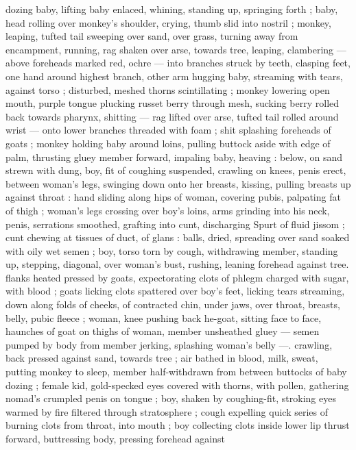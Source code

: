 dozing baby, lifting baby enlaced, whining, standing up, springing 
forth ; baby, head rolling over monkey's shoulder, crying, thumb slid 
into nostril ; monkey, leaping, tufted tail sweeping over sand, over 
grass, turning away from encampment, running, rag shaken over 
arse, towards tree, leaping, clambering --- above foreheads marked 
red, ochre --- into branches struck by teeth, clasping feet, one hand 
around highest branch, other arm hugging baby, streaming with 
tears, against torso ; disturbed, meshed thorns scintillating ; monkey 
lowering open mouth, purple tongue plucking russet berry through 
mesh, sucking berry rolled back towards pharynx, shitting --- rag 
lifted over arse, tufted tail rolled around wrist --- onto lower 
branches threaded with foam ; shit splashing foreheads of goats ; 
monkey holding baby around loins, pulling buttock aside with edge 
of palm, thrusting gluey member forward, impaling baby, heaving : 
below, on sand strewn with dung, boy, fit of coughing suspended, 
crawling on knees, penis erect, between woman's legs, swinging 
down onto her breasts, kissing, pulling breasts up against throat : 
hand sliding along hips of woman, covering pubis, palpating fat of 
thigh ; woman's legs crossing over boy's loins, arms grinding into his 
neck, penis, serrations smoothed, grafting into cunt, discharging 
Spurt of fluid jissom ; cunt chewing at tissues of duct, of glans : 
balls, dried, spreading over sand soaked with oily wet semen ; boy, 
torso torn by cough, withdrawing member, standing up, stepping, 
diagonal, over woman's bust, rushing, leaning forehead against tree. 
flanks heated pressed by goats, expectorating clots of phlegm 
charged with sugar, with blood ; goats licking clots spattered over 
boy's feet, licking tears streaming, down along folds of cheeks, of 
contracted chin, under jaws, over throat, breasts, belly, pubic fleece 
; woman, knee pushing back he-goat, sitting face to face, haunches 
of goat on thighs of woman, member unsheathed gluey --- semen 
pumped by body from member jerking, splashing woman's belly ---. 
crawling, back pressed against sand, towards tree ; air bathed in 
blood, milk, sweat, putting monkey to sleep, member half-withdrawn 
from between buttocks of baby dozing ; female kid, gold-specked 
eyes covered with thorns, with pollen, gathering nomad's crumpled 
penis on tongue ; boy, shaken by coughing-fit, stroking eyes warmed 
by fire filtered through stratosphere ; cough expelling quick series of 
burning clots from throat, into mouth ; boy collecting clots inside 
lower lip thrust forward, buttressing body, pressing forehead against 
